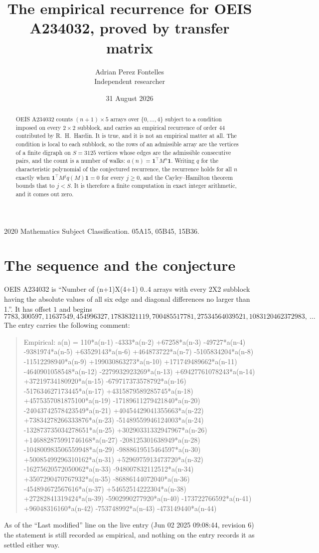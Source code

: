 \documentclass[11pt,a4paper]{article}
\title{The empirical recurrence for OEIS A234032, proved by transfer matrix}
\author{Adrian Perez Fontelles\\ \small Independent researcher}
\date{31 August 2026}
\theoremstyle{plain}
\theoremstyle{definition}
\begin{document}
\maketitle

\begin{abstract}
OEIS A234032 counts $(n+1)\times5$ arrays over $\{0,\dots,4\}$ subject to a condition imposed on
every $2\times2$ subblock, and carries an empirical recurrence of order $44$ contributed
by R.~H.~Hardin. It is true, and it is not an empirical matter at all. The condition is local
to each subblock, so the rows of an admissible array are the vertices of a finite digraph
on $S=3125$ vertices whose edges are the admissible consecutive pairs, and the count is a
number of walks: $a(n)=\mathbf{1}^{\!\top}M^{n}\mathbf{1}$. Writing $q$
for the characteristic polynomial of the conjectured recurrence, the recurrence holds for all
$n$ exactly when $\mathbf{1}^{\!\top}M^{j}q(M)\mathbf{1}=0$ for every $j\ge0$, and the
Cayley--Hamilton theorem bounds that to $j<S$. It is therefore a finite computation in exact
integer arithmetic, and it comes out zero.
\end{abstract}

\noindent\small 2020 Mathematics Subject Classification. 05A15, 05B45, 15B36.\normalsize

\section{The sequence and the conjecture}

OEIS A234032 is ``Number of (n+1)X(4+1) 0..4 arrays with every 2X2 subblock having the absolute values of all six edge and diagonal differences no larger than 1.''. It has offset $1$ and begins
\[
7783, 300597, 11637549, 454996327, 17838321119, 700485517781, 27534564039521, 1083120462372983,\ \dots
\]
The entry carries the following comment:
\begin{quote}\small
Empirical: a(n) = 110*a(n-1) -4333*a(n-2) +67258*a(n-3) -49727*a(n-4) -9381974*a(n-5) +63529143*a(n-6) +464873722*a(n-7) -5105834204*a(n-8) -11512298940*a(n-9) +199030863273*a(n-10) +171749489662*a(n-11) -4640901058548*a(n-12) -2279932923269*a(n-13) +69427761078243*a(n-14) +37219734180920*a(n-15) -679717373578792*a(n-16) -517634627173445*a(n-17) +4315879589285745*a(n-18) +4575357081875100*a(n-19) -17189611279421840*a(n-20) -24043742578423549*a(n-21) +40454429041355663*a(n-22) +73834278266333876*a(n-23) -51489559946124003*a(n-24) -132873735034278651*a(n-25) +30290331332947967*a(n-26) +146882875991746168*a(n-27) -208125301638949*a(n-28) -104800983506559948*a(n-29) -9888619515464597*a(n-30) +50085499296310162*a(n-31) +5296975913473720*a(n-32) -16275620572050062*a(n-33) -948007832112512*a(n-34) +3507290470767932*a(n-35) -86886144072040*a(n-36) -454894672567616*a(n-37) +54652514222304*a(n-38) +27282841319424*a(n-39) -5902990277920*a(n-40) -173722766592*a(n-41) +96048316160*a(n-42) -753748992*a(n-43) -473149440*a(n-44)
\end{quote}
As of the ``Last modified'' line on the live entry (Jun 02 2025 09:08:44, revision 6) the statement is
still recorded as empirical, and nothing on the entry records it as settled either way.
\end{document}
